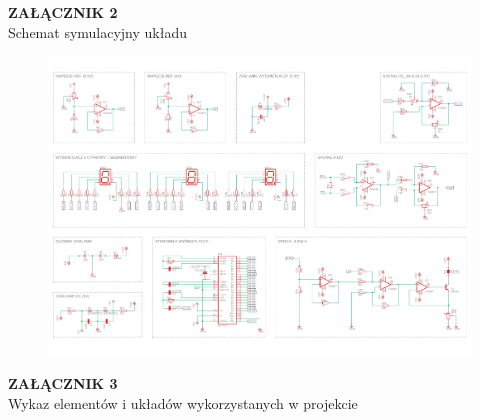 \documentclass[12pt]{article}
\begin{document}
\newpage

\begin{center}
\LARGE \textbf{ZAŁĄCZNIK 2} \\
\large Schemat symulacyjny układu \\
\end{center}

\begin{figure}[h!]
	\centering
	\includegraphics[scale=0.65, angle=-90, origin=c]{ammeter.png}
\end{figure}

\newpage

\begin{center}
\LARGE \textbf{ZAŁĄCZNIK 3} \\
\large Wykaz elementów i układów wykorzystanych w projekcie \\
\end{center}
\end{document}
